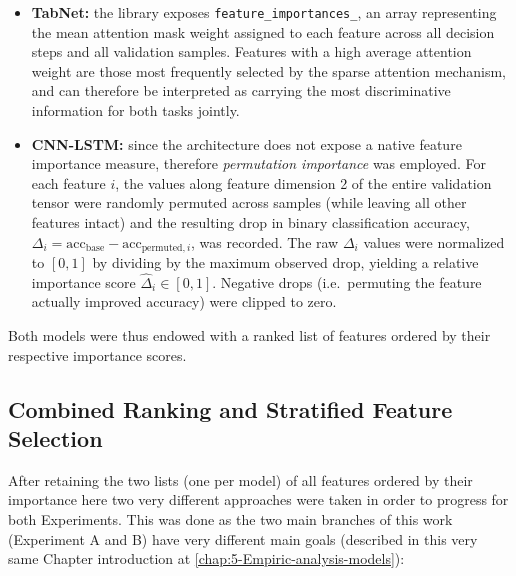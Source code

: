 \documentclass[../main.tex]{subfiles}
\begin{document}
\begin{itemize}
    \item \textbf{TabNet:} the library exposes \texttt{feature\_importances\_}, an array representing the mean attention mask weight assigned to each feature across all decision steps and all validation samples.  Features with a high average attention weight are those most frequently selected by the sparse attention mechanism, and can therefore be interpreted as carrying the most discriminative information for both tasks jointly.
    \item \textbf{CNN-LSTM:} since the architecture does not expose a native feature importance measure, therefore \emph{permutation importance} was employed.  For each feature $i$, the values along feature dimension 2 of the entire validation tensor were randomly permuted across samples (while leaving all other features intact) and the resulting drop in binary classification accuracy, $\Delta_i = \mathrm{acc}_{\text{base}} - \mathrm{acc}_{\text{permuted},i}$, was recorded.  The raw $\Delta_i$ values were normalized to $[0, 1]$ by dividing by the maximum observed drop, yielding a relative importance score $\hat{\Delta}_i \in [0, 1]$.  Negative drops (i.e.\ permuting the feature actually improved accuracy) were clipped to zero.
\end{itemize}

Both models were thus endowed with a ranked list of features ordered by their respective importance scores.

\newpage
\subsection{Combined Ranking and Stratified Feature Selection}
\label{sec:combined-ranking}

After retaining the two lists (one per model) of all features ordered by their importance here two very different approaches were taken in order to progress for both Experiments. This was done as the two main branches of this work (Experiment A and B) have very different main goals (described in this very same Chapter introduction at \ref{chap:5-Empiric-analysis-models}):
\end{document}
